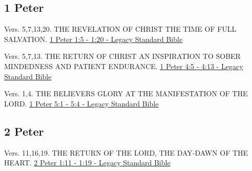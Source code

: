 \documentclass[
  ignorenonframetext,
]{beamer}
\begin{document}
\subsection{1 Peter}\label{peter}

\begin{frame}{1}
\label{section-243}
\begin{block}{Vers. 5,7,13,20. THE REVELATION OF CHRIST THE TIME OF FULL
SALVATION.}
\label{vers.-571320.-the-revelation-of-christ-the-time-of-full-salvation.}
\href{https://read.lsbible.org/?q=1pet1\%3A5-20}{1 Peter 1:5 - 1:20 -
Legacy Standard Bible}
\end{block}
\end{frame}

\begin{frame}{4}
\label{section-244}
\begin{block}{Vers. 5,7,13. THE RETURN OF CHRIST AN INSPIRATION TO SOBER
MINDEDNESS AND PATIENT ENDURANCE.}
\label{vers.-5713.-the-return-of-christ-an-inspiration-to-sober-mindedness-and-patient-endurance.}
\href{https://read.lsbible.org/?q=1pet4\%3A5-13}{1 Peter 4:5 - 4:13 -
Legacy Standard Bible}
\end{block}
\end{frame}

\begin{frame}{5}
\label{section-245}
\begin{block}{Vers. 1,4. THE BELIEVER\textquotesingle S GLORY AT THE
MANIFESTATION OF THE LORD.}
\label{vers.-14.-the-believers-glory-at-the-manifestation-of-the-lord.}
\href{https://read.lsbible.org/?q=1pet5\%3A1-4}{1 Peter 5:1 - 5:4 -
Legacy Standard Bible}
\end{block}
\end{frame}

\subsection{2 Peter}\label{peter-1}

\begin{frame}{1}
\label{section-246}
\begin{block}{Vers. 11,16,19. THE RETURN OF THE LORD, THE DAY-DAWN OF
THE HEART.}
\label{vers.-111619.-the-return-of-the-lord-the-day-dawn-of-the-heart.}
\href{https://read.lsbible.org/?q=2pet1\%3A11-19}{2 Peter 1:11 - 1:19 -
Legacy Standard Bible}
\end{block}
\end{frame}
\end{document}
